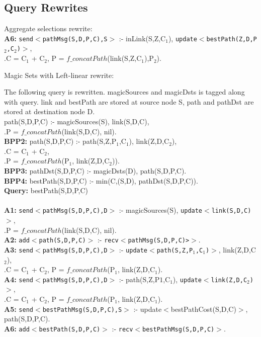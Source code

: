 \documentclass{article}
\newcommand{\code}[1]{{\tt \small #1}}
\newcommand{\datalogspace}{\textcolor[gray]{1}{.}\hspace{0.8in}}
\begin{document}
\subsection{Query Rewrites}

Aggregate selections rewrite:\\
{\bf A6:} \code{send$<$pathMsg(S,D,P,C),S$>$} :- inLink(S,Z,C$_{1}$), \code{update$<$bestPath(Z,D,P$_{2}$,C$_{2}$)$>$}, \\
\datalogspace C = C$_{1}$ + C$_{2}$, P = $f\_concatPath$(link(S,Z,C$_{1}$),P$_{2}$).

\noindent Magic Sets with Left-linear rewrite:

The following query is rewritten. magicSources and magicDsts is tagged
along with query. link and bestPath are stored at source node S, path and
pathDst are stored at destination node D.\\

 path(S,D,P,C) :- magicSources(S), link(S,D,C), \\
\datalogspace  P = $f\_concatPath$(link(S,D,C), nil). \\
{\bf BPP2: } path(S,D,P,C) :- path(S,Z,P$_{1}$,C$_{1}$), link(Z,D,C$_{2}$),\\  
\datalogspace C = C$_{1}$ + C$_{2}$, \\
\datalogspace P = $f\_concatPath$(P$_{1}$, link(Z,D,C$_{2}$)). \\
{\bf BPP3: } pathDst(S,D,P,C) :- magicDsts(D), path(S,D,P,C). \\
{\bf BPP4: } bestPath(S,D,P,C) :- min(C,(S,D), pathDst(S,D,P,C)). \\
{\bf Query: } bestPath(S,D,P,C)\\

\\
{\bf A1:} \code{send$<$pathMsg(S,D,P,C),D$>$} :- magicSources(S),
\code{update$<$link(S,D,C)$>$}, \\
\datalogspace P = $f\_concatPath$(link(S,D,C), nil). \\
{\bf A2:} \code{add$<$path(S,D,P,C)$>$} :- \code{recv$<$pathMsg(S,D,P,C)>$>$}.\\
{\bf A3:} \code{send$<$pathMsg(S,D,P,C),D$>$} :-
\code{update$<$path(S,Z,P$_{1}$,C$_{1}$)$>$}, link(Z,D,C$_{2}$), \\
\datalogspace C = C$_{1}$ + C$_{2}$, P = $f\_concatPath$(P$_{1}$,
link(Z,D,C$_{1}$).\\
{\bf A4:} \code{send$<$pathMsg(S,D,P,C),D$>$} :- path(S,Z,P${1}$,C$_{1}$), \code{update$<$link(Z,D,C$_{2}$)$>$}, \\
\datalogspace C = C$_{1}$ + C$_{2}$, P = $f\_concatPath$(P$_{1}$, link(Z,D,C$_{1}$).\\
{\bf A5:} \code{send$<$bestPathMsg(S,D,P,C),S$>$} :-
update$<$bestPathCost(S,D,C)$>$, path(S,D,P,C). \\ 
{\bf A6:} \code{add$<$bestPath(S,D,P,C)$>$} :- \code{recv$<$bestPathMsg(S,D,P,C)$>$}. \\ 
\end{document}
